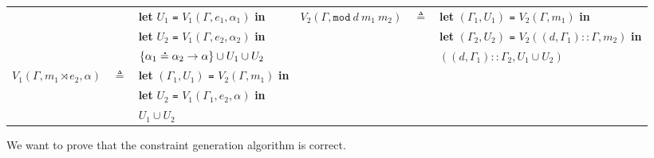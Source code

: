 \documentclass{article}
\theoremstyle{definition}
\newcommand*{\cons}{::}
\newcommand*{\A}[1]{\overset{\,_{\mbox{\Large .}}}{#1}}
\newcommand*{\modid}{d}
\newcommand*{\link}[2]{{#1}\rtimes{#2}}
\newcommand*{\Letm}{\mathtt{mod}}
\begin{document}
\begin{tabular}{rclrcl}
                                       &              & \textbf{let} $U_1$ \texttt{=} $V_1(\Gamma,e_1,\alpha_1)$ \textbf{in}              & $V_2(\Gamma,\Letm\:\modid\:m_1\:m_2)$ & $\triangleq$ & \textbf{let} $(\Gamma_1,U_1)$ \texttt{=} $V_2(\Gamma,m_1)$ \textbf{in}                       \\
                                       &              & \textbf{let} $U_2$ \texttt{=} $V_1(\Gamma,e_2,\alpha_2)$ \textbf{in}              &                                       &              & \textbf{let} $(\Gamma_2,U_2)$ \texttt{=} $V_2((\modid,\Gamma_1)\cons\Gamma,m_2)$ \textbf{in} \\
                                       &              & $\{\alpha_1\A{=}\alpha_2\rightarrow\alpha\}\cup U_1\cup U_2$                      &                                       &              & $((\modid,\Gamma_1)\cons\Gamma_2,U_1\cup U_2)$                                               \\
  $V_1(\Gamma,\link{m_1}{e_2},\alpha)$ & $\triangleq$ & \textbf{let} $(\Gamma_1,U_1)$ \texttt{=} $V_2(\Gamma,m_1)$ \textbf{in}                                                                                                                                                                  \\
                                       &              & \textbf{let} $U_2$ \texttt{=} $V_1(\Gamma_1,e_2,\alpha)$ \textbf{in}                                                                                                                                                                    \\
                                       &              & $U_1\cup U_2$                                                                                                                                                                                                                           \\
\end{tabular}

\vphantom{}

We want to prove that the constraint generation algorithm is correct.
\end{document}
